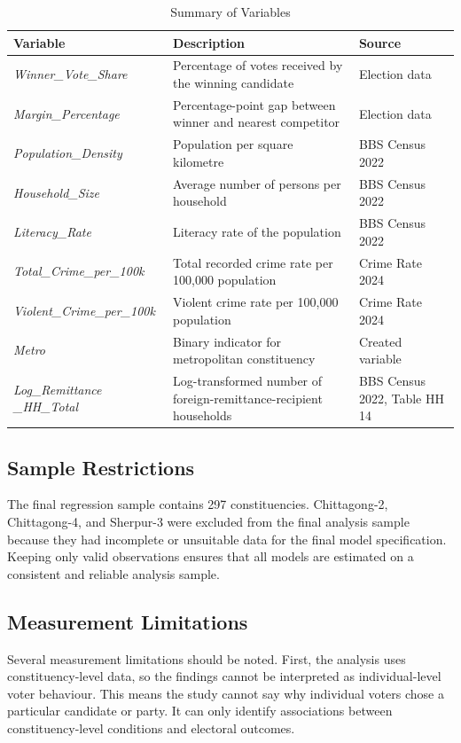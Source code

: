 \documentclass[12pt,a4paper]{article}
\begin{document}
\begin{table}[H]
\centering
\caption{Summary of Variables}
\label{tab:variables}
\begin{tabular}{p{4cm} p{6.5cm} p{4cm}}
\toprule
\textbf{Variable} & \textbf{Description} & \textbf{Source} \\
\midrule
\textit{Winner\_Vote\_Share} & Percentage of votes received by the winning candidate & Election data \\
\textit{Margin\_Percentage} & Percentage-point gap between winner and nearest competitor & Election data \\
\textit{Population\_Density} & Population per square kilometre & BBS Census 2022 \\
\textit{Household\_Size} & Average number of persons per household & BBS Census 2022 \\
\textit{Literacy\_Rate} & Literacy rate of the population & BBS Census 2022 \\
\textit{Total\_Crime\_per\_100k} & Total recorded crime rate per 100,000 population & Crime Rate 2024 \\
\textit{Violent\_Crime\_per\_100k} & Violent crime rate per 100,000 population & Crime Rate 2024 \\
\textit{Metro} & Binary indicator for metropolitan constituency & Created variable \\
\textit{Log\_Remittance
\_HH\_Total} & Log-transformed number of foreign-remittance-recipient households & BBS Census 2022, Table HH 14 \\
\bottomrule
\end{tabular}
\end{table}

\subsection{Sample Restrictions}

The final regression sample contains 297 constituencies. Chittagong-2, Chittagong-4, and Sherpur-3 were excluded from the final analysis sample because they had incomplete or unsuitable data for the final model specification. Keeping only valid observations ensures that all models are estimated on a consistent and reliable analysis sample.

\subsection{Measurement Limitations}

Several measurement limitations should be noted. First, the analysis uses constituency-level data, so the findings cannot be interpreted as individual-level voter behaviour. This means the study cannot say why individual voters chose a particular candidate or party. It can only identify associations between constituency-level conditions and electoral outcomes.
\end{document}
